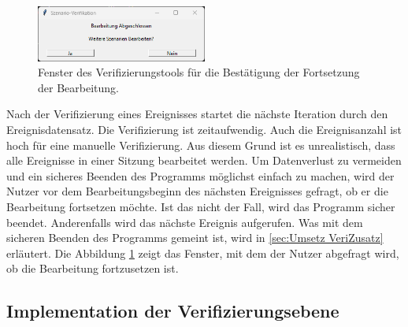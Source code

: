 \begin{figure}
    \begin{center}
        \vspace*{-9mm}
        \includegraphics[width=0.5\textwidth]{img/Verifikationstool/Verifikation Abfrage Bearbeitung fortsetzen.png}
        \vspace*{-10mm}
        \caption{Fenster des Verifizierungstools für die Bestätigung der Fortsetzung der Bearbeitung.}
        \label{fig:verif BearbFortsetz}
    \end{center}
\end{figure}
Nach der Verifizierung eines Ereignisses startet die nächste Iteration durch den Ereignisdatensatz. Die Verifizierung ist zeitaufwendig. Auch die Ereignisanzahl ist hoch für eine manuelle Verifizierung. Aus diesem Grund ist es unrealistisch, dass alle Ereignisse in einer Sitzung bearbeitet werden. Um Datenverlust zu vermeiden und ein sicheres Beenden des Programms möglichst einfach zu machen, wird der Nutzer vor dem Bearbeitungsbeginn des nächsten Ereignisses gefragt, ob er die Bearbeitung fortsetzen möchte. Ist das nicht der Fall, wird das Programm sicher beendet. Anderenfalls wird das nächste Ereignis aufgerufen. Was mit dem sicheren Beenden des Programms gemeint ist, wird in \autoref{sec:Umsetz VeriZusatz} erläutert. Die Abbildung \ref{fig:verif BearbFortsetz} zeigt das Fenster, mit dem der Nutzer abgefragt wird, ob die Bearbeitung fortzusetzen ist.


\subsection{Implementation der Verifizierungsebene} \label{sec:Umsetz VeriEbene}

